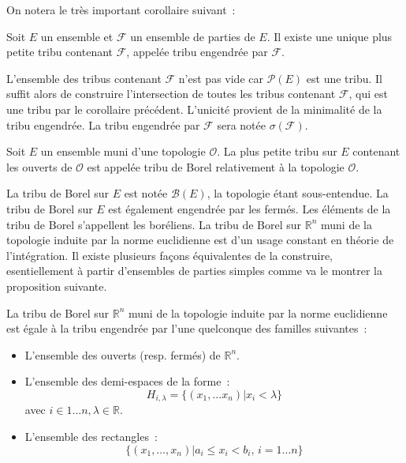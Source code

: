 On notera le très important corollaire suivant~:
\begin{mandatory}
\begin{corollaire}
Soit $E$ un ensemble et $\mathcal{F}$ un ensemble de parties de
$E$. Il existe une unique plus petite tribu contenant
$\mathcal{F}$, appelée tribu engendrée par $\mathcal{F}$.
\end{corollaire}
\end{mandatory}
L'ensemble des tribus contenant $\mathcal{F}$ n'est pas
vide car $\mathcal{P}(E)$ est une tribu.
Il suffit alors de construire l'intersection de toutes les
tribus contenant $\mathcal{F}$, qui est une
tribu par le corollaire précédent. L'unicité provient de la
minimalité de la tribu engendrée. 
La tribu engendrée par $\mathcal{F}$ sera notée $\sigma(\mathcal{F})$.
\begin{mandatory}
\begin{defn}
Soit $E$ un ensemble muni d'une topologie $\mathcal{O}$. La plus
petite tribu sur $E$ contenant les ouverts de $
\mathcal{O}$ est appelée tribu de Borel relativement à la
topologie $\mathcal{O}$.
\end{defn}
\end{mandatory}
La tribu de Borel sur $E$ est notée $\mathcal{B}(E)$, la topologie
étant sous-entendue. La tribu de Borel sur $E$ est également engendrée
par les fermés. Les éléments de la tribu de Borel s'appellent les boréliens.
La tribu de Borel  sur $\mathbb{R}^n$ muni de
la topologie induite par la norme euclidienne est d'un usage constant
en théorie de l'intégration. Il existe plusieurs façons équivalentes
de la construire, esentiellement à partir d'ensembles de parties simples comme
va le montrer la proposition suivante.
\begin{mandatory}
\begin{prop}
 La tribu de Borel sur $\mathbb{R}^n$ muni de
la topologie induite par la norme euclidienne est égale à la tribu engendrée par l'une quelconque
des familles suivantes~:
\begin{itemize}
\item L'ensemble des ouverts (resp. fermés) de $\mathbb{R}^n$.
\item L'ensemble des demi-espaces de la forme~:
\[
H_{i,\lambda} = \{ (x_1, \dots x_n) | x_i < \lambda \} 
\]
avec $i \in 1 \dots n, \lambda \in \mathbb{R}$.
\item L'ensemble des rectangles~:
\[
\{ (x_1,\dots ,x_n) | a_i \leq  x_i < b_i, \, i=1\dots n \}
\]
\end{itemize}
\end{prop}
\end{mandatory}
